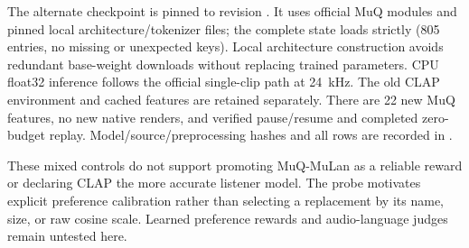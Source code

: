 The alternate checkpoint is pinned to revision . It uses official MuQ modules and pinned local architecture/tokenizer files; the complete state loads strictly (805 entries, no missing or unexpected keys). Local architecture construction avoids redundant base-weight downloads without replacing trained parameters. CPU float32 inference follows the official single-clip path at 24~kHz. The old CLAP environment and cached features are retained separately. There are 22 new MuQ features, no new native renders, and verified pause/resume and completed zero-budget replay. Model/source/preprocessing hashes and all rows are recorded in .

These mixed controls do not support promoting MuQ-MuLan as a reliable reward or declaring CLAP the more accurate listener model. The probe motivates explicit preference calibration rather than selecting a replacement by its name, size, or raw cosine scale. Learned preference rewards and audio-language judges remain untested here.
